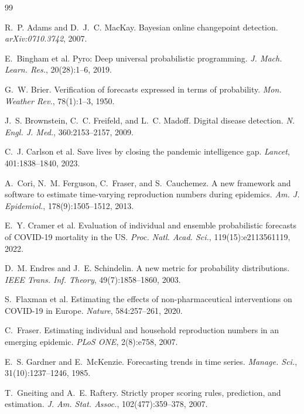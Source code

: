 \documentclass[10pt,twocolumn]{article}
\theoremstyle{definition}
\begin{document}
{\small

\begin{thebibliography}{99}

R.~P. Adams and D.~J.~C. MacKay. Bayesian online changepoint detection.
\emph{arXiv:0710.3742}, 2007.

E.~Bingham et al. Pyro: Deep universal probabilistic programming.
\emph{J. Mach. Learn. Res.}, 20(28):1--6, 2019.

G.~W. Brier. Verification of forecasts expressed in terms of probability.
\emph{Mon. Weather Rev.}, 78(1):1--3, 1950.

J.~S. Brownstein, C.~C. Freifeld, and L.~C. Madoff. Digital disease detection.
\emph{N. Engl. J. Med.}, 360:2153--2157, 2009.

C.~J. Carlson et al. Save lives by closing the pandemic intelligence gap.
\emph{Lancet}, 401:1838--1840, 2023.

A.~Cori, N.~M. Ferguson, C.~Fraser, and S.~Cauchemez. A new framework and
software to estimate time-varying reproduction numbers during epidemics.
\emph{Am. J. Epidemiol.}, 178(9):1505--1512, 2013.

E.~Y. Cramer et al. Evaluation of individual and ensemble probabilistic forecasts
of COVID-19 mortality in the US. \emph{Proc. Natl. Acad. Sci.},
119(15):e2113561119, 2022.

D.~M. Endres and J.~E. Schindelin. A new metric for probability distributions.
\emph{IEEE Trans. Inf. Theory}, 49(7):1858--1860, 2003.

S.~Flaxman et al. Estimating the effects of non-pharmaceutical interventions on
COVID-19 in Europe. \emph{Nature}, 584:257--261, 2020.

C.~Fraser. Estimating individual and household reproduction numbers in an
emerging epidemic. \emph{PLoS ONE}, 2(8):e758, 2007.

E.~S. Gardner and E.~McKenzie. Forecasting trends in time series.
\emph{Manage. Sci.}, 31(10):1237--1246, 1985.

T.~Gneiting and A.~E. Raftery. Strictly proper scoring rules, prediction, and
estimation. \emph{J. Am. Stat. Assoc.}, 102(477):359--378, 2007.


\end{thebibliography}}
\end{document}
